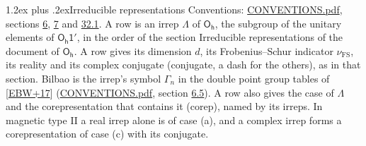 \documentclass[10pt,a4paper]{article}
\makeatletter
\renewcommand\section{\@startsection{section}{1}{\z@}{-3ex plus -1ex minus -.2ex}%
  {1.2ex plus .2ex}{\normalfont\large\sffamily\bfseries\color{parttitle}}}
\numberwithin{equation}{section}
\newcommand{\grp}[1]{\mathsf{#1}}
\newcommand{\fsind}{\nu_{\mathrm{FS}}}
\makeatother
\begin{document}
\section{Irreducible representations}\label{s:irreps}
Conventions: \href{../../CONVENTIONS.pdf}{CONVENTIONS.pdf}, sections \href{../../../rotation/CONVENTIONS.pdf\#conv.6}{6}, \href{../../../rotation/CONVENTIONS.pdf\#conv.7}{7} and \href{../../CONVENTIONS.pdf\#conv.32.1}{32.1}.
\leavevmode\label{n:irrep.Delta}A row is an irrep $\Lambda$ of $\grp{O_{h}}$, the subgroup of the unitary elements of $\grp{O_{h}1'}$, in the order of the section Irreducible representations of the document of \href{../../../rotation/data/pdf/Oh.pdf}{$\grp{O_{h}}$}. \label{n:index.dimension}\label{n:index.frobenius}\label{n:head.irrep}\label{n:head.reality}\label{n:head.conjugate}A row gives its dimension $d$, its Frobenius--Schur indicator $\fsind$, its reality and its complex conjugate (conjugate, a dash for the others), as in that section. \label{n:head.bilbao}\label{n:irrep.alias.gamma}Bilbao is the irrep's symbol $\Gamma_n$ in the double point group tables of [\href{../../../REFERENCES.pdf\#ref.EBW+17}{EBW+17}] (\href{../../CONVENTIONS.pdf}{CONVENTIONS.pdf}, section \href{../../../rotation/CONVENTIONS.pdf\#conv.6.5}{6.5}). \label{n:head.case.corep}\label{n:head.corep}A row also gives the case of $\Lambda$ and the corepresentation that contains it (corep), named by its irreps. In magnetic type II a real irrep alone is of case (a), and a complex irrep forms a corepresentation of case (c) with its conjugate.
\setlength{\emergencystretch}{2em}\par\setlength{\emergencystretch}{0pt}
\end{document}
